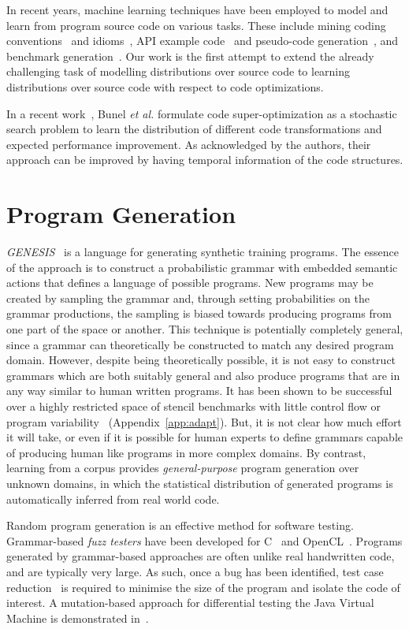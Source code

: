In recent years, machine learning techniques have been employed to model and learn from program source code on various tasks. These include mining coding conventions~\cite{Allamanis2014a} and idioms~\cite{Allamanis2014}, API example code~\cite{Zhang2015a} and pseudo-code generation~\cite{Oda2015}, and benchmark generation~\cite{Cummins2017a}. Our work is the first attempt to extend the already challenging task of modelling distributions over source code to learning distributions over source code with respect to code optimizations.

In a recent work~\cite{Bunel2017a}, Bunel \emph{et al.} formulate code super-optimization as a stochastic search problem to learn the distribution of different code transformations and expected performance improvement. As acknowledged by the authors, their approach can be improved by having temporal information of the code structures.


\section{Program Generation}

\emph{GENESIS}~\cite{Chiu2015} is a language for generating synthetic training programs. The essence of the approach is to construct a probabilistic grammar with embedded semantic actions that defines a language of possible programs. New programs may be created by sampling the grammar and, through setting probabilities on the grammar productions, the sampling is biased towards producing programs from one part of the space or another. This technique is potentially completely general, since a grammar can theoretically be constructed to match any desired program domain. However, despite being theoretically possible, it is not easy to construct grammars which are both suitably general and also produce programs that are in any way similar to human written programs. It has been shown to be successful over a highly restricted space of stencil benchmarks with little control flow or program variability~\cite{Garvey2015b,Falch2015} (Appendix~\ref{app:adapt}). But, it is not clear how much effort it will take, or even if it is possible for human experts to define grammars capable of producing human like programs in more complex domains. By contrast, learning from a corpus provides \emph{general-purpose} program generation over unknown domains, in which the statistical distribution of generated programs is automatically inferred from real world code.

Random program generation is an effective method for software testing. Grammar-based \emph{fuzz testers} have been developed for C~\cite{Yang2012} and OpenCL~\cite{Lidbury2015a}. Programs generated by grammar-based approaches are often  unlike real handwritten code, and are typically very large. As such, once a bug has been identified, test case reduction~\cite{Regehr2012a} is required to minimise the size of the program and isolate the code of interest. A mutation-based approach for differential testing the Java Virtual Machine is demonstrated in~\cite{Chena}.

